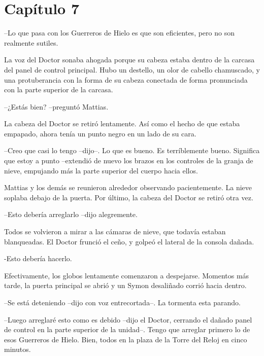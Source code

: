 \chapter*{Capítulo 7}

--Lo que pasa con los Guerreros de Hielo es que son eficientes, pero no son realmente sutiles.



La voz del Doctor sonaba ahogada porque su cabeza estaba dentro de la carcasa del panel de control principal. Hubo un destello, un olor de cabello chamuscado, y una protuberancia con la forma de su cabeza conectada de forma pronunciada con la parte superior de la carcasa.



--¿Estás bien? --preguntó Mattias.



La cabeza del Doctor se retiró lentamente. Así como el hecho de que estaba empapado, ahora tenía un punto negro en un lado de su cara.



--Creo que casi lo tengo --dijo--. Lo que es bueno. Es terríblemente bueno. Significa que estoy a punto --extendió de nuevo los brazos en los controles de la granja de nieve, empujando más la parte superior del cuerpo hacia ellos.



Mattias y los demás se reunieron alrededor observando pacientemente. La nieve soplaba debajo de la puerta. Por último, la cabeza del Doctor se retiró otra vez.



--Esto debería arreglarlo --dijo alegremente.



Todos se volvieron a mirar a las cámaras de nieve, que todavía estaban blanqueadas. El Doctor frunció el ceño, y golpeó el lateral de la consola dañada.


-Esto debería hacerlo.



Efectivamente, los globos lentamente comenzaron a despejarse. Momentos más tarde, la puerta principal se abrió y un Symon desaliñado corrió hacia dentro.



--Se está deteniendo --dijo con voz entrecortada--. La tormenta esta parando.



--Luego arreglaré esto como es debido --dijo el Doctor, cerrando el dañado panel de control en la parte superior de la unidad--. Tengo que arreglar primero lo de esos Guerreros de Hielo. Bien, todos en la plaza de la Torre del Reloj en cinco minutos.



